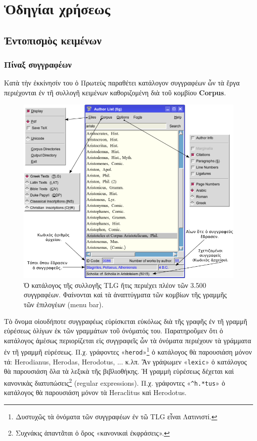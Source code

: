 \documentclass[12pt,a4paper]{article}
\begin{document}
\section{Ὁδηγίαι χρήσεως}
  \subsection{Ἐντοπισμὸς κειμένων}
    \subsubsection*{Πίναξ συγγραφέων}
      Κατὰ τὴν ἐκκίνησίν του ὁ Πρωτεὺς παραθέτει
      κατάλογον συγγραφέων ὧν τὰ ἔργα περιέχονται ἐν τῆ συλλογῆ κειμένων
      καθοριζομένη διὰ τοῦ κομβίου {\bf Corpus}.
          \begin{figure}[htp]
            \begin{center}
              \includegraphics[scale=0.7]{../images/author-gr.png}
              \caption{Ὁ κατάλογος τῆς συλλογῆς TLG ἥτις
                      περιέχει πλέον τῶν 3.500 συγγραφέων.
                      Φαίνονται καὶ τὰ ἀναπτύγματα τῶν κομβίων
                      τῆς γραμμῆς τῶν ἐπιλογέων ({\small menu bar}).}
            \end{center}
          \end{figure}
    Τὸ ὄνομα οἱουδήποτε συγγραφέως εὑρίσκεται εὐκόλως διὰ τῆς γραφῆς ἐν τῆ
    γραμμῆ εὑρέσεως ὀλίγων ἐκ τῶν γραμμάτων τοῦ ὀνόματός του. Παρατηροῦμεν ὅτι ὁ
    κατάλογος ἀμέσως περιορίζεται εἰς συγγραφεῖς ὧν τὰ ὀνόματα περιέχουν τὰ
    γράμματα ἐν τῆ γραμμῆ εὑρέσεως.
    Π.χ. γράφοντες «{\tt herod}»\footnote{Δυστυχῶς τὰ ὀνόματα τῶν συγγραφέων
    ἐν τῶ TLG εἶναι Λατινιστί.} ὁ κατάλογος θὰ παρουσιάση μόνον τά:
    Herodianus, Herodas, Herodotus, ... κ.λπ.
    Ἂν γράψωμεν «{\tt lexic}» ὁ κατάλογος θὰ παρουσιάση ὅλα τὰ λεξικὰ τῆς
    βιβλιοθήκης.
    Ἡ γραμμὴ εὑρέσεως δέχεται καὶ κανονικὰς διατυπώσεις\footnote{Συχνάκις
    ἀπαντᾶται ὁ ὅρος «κανονικαὶ ἐκφράσεις».} (regular expressions).
    Π.χ. γράφοντες «{\tt \textasciicircum{}h.*tus}» ὁ κατάλογος θὰ  παρουσιάση
    μόνον τὰ Heraclitus καὶ Herodotus.
\end{document}
